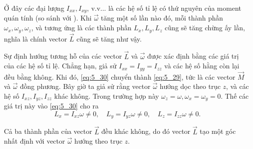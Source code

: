 \noindent
Ở đây các đại lượng $I_{xx}, I_{xy}$, v.v... là các hệ số tỉ lệ có thứ nguyên của moment quán tính (so sánh với ). Khi $\vec{\omega}$ tăng một số lần nào đó, mỗi thành phần $\omega_x, \omega_y, \omega_z$, và tương ứng là các thành phần $L_x, L_y, L_z$ cũng sẽ tăng chừng ấy lần, nghĩa là chính vector $\vec{L}$ cũng sẽ tăng như vậy.

Sự định hướng tương hỗ của các vector $\vec{L}$ và $\vec{\omega}$ được xác định bằng các giá trị của các hệ số tỉ lệ. Chẳng hạn, giả sử $I_{xx}=I_{yy}=I_{zz}$ và các hệ số hằng còn lại đều bằng không. Khi đó, \eqref{eq:5_30} chuyển thành \eqref{eq:5_29}, tức là các vector $\vec{M}$ và $\vec{\omega}$ đồng phương. Bây giờ ta giả sử rằng vector $\vec{\omega}$ hướng dọc theo trục $z$, và các hệ số $I_{xz}, I_{yz}, I_{zz}$ khác không. Trong trường hợp này $\omega_z=\omega, \omega_x=\omega_y=0$. Thế các giá trị này vào \eqref{eq:5_30} cho ra
\begin{equation*}
L_x = I_{xz}\omega\neq 0,\quad L_y = I_{yz}\omega\neq 0,\quad L_z = I_{zz}\omega\neq 0.
\end{equation*}

\noindent
Cả ba thành phần của vector $\vec{L}$ đều khác không, do đó vector $\vec{L}$ tạo một góc nhất định với vector $\vec{\omega}$ hướng theo trục $z$.

